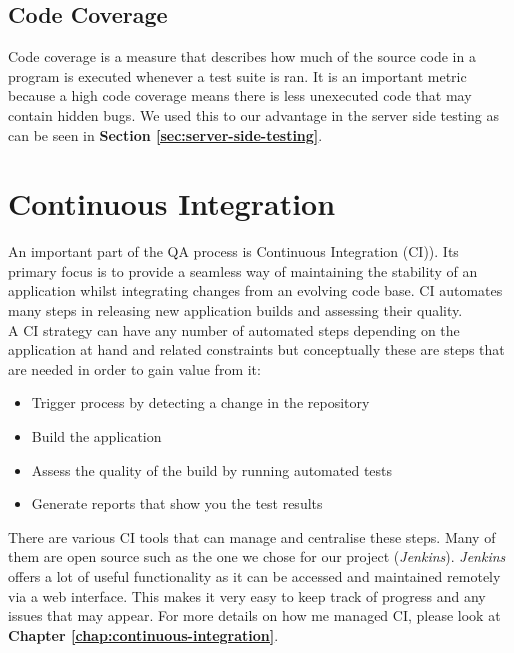 \subsection{Code Coverage}
\label{subsec:code-coverage}

Code coverage is a measure that describes how much of the source code in a program is executed whenever a test suite is ran. It is an important metric because a high code coverage means there is less unexecuted code that may contain hidden bugs. We used this to our advantage in the server side testing as can be seen in \textbf{Section \ref{sec:server-side-testing}}.

\section{Continuous Integration}
\label{sec:continuous-integration}

An important part of the QA process is Continuous Integration (CI)). Its primary focus is to provide a seamless way of maintaining the stability of an application whilst integrating changes from an evolving code base. CI automates many steps in releasing new application builds and assessing their quality.
\\

A CI strategy can have any number of automated steps depending on the application at hand and related constraints but conceptually these are steps that are needed in order to gain value from it:

\begin{itemize}
    \item Trigger process by detecting a change in the repository
    \item Build the application
    \item Assess the quality of the build by running automated tests
    \item Generate reports that show you the test results
\end{itemize}

There are various CI tools that can manage and centralise these steps. Many of them are open source such as the one we chose for our project (\textit{Jenkins}). \textit{Jenkins} offers a lot of useful functionality as it can be accessed and maintained remotely via a web interface. This makes it very easy to keep track of progress and any issues that may appear. For more details on how me managed CI, please look at \textbf{Chapter \ref{chap:continuous-integration}}.

